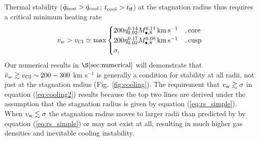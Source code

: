 \documentclass[usenatbib,fleqn]{mn2e}
\newcommand\lsim{\mathrel{\rlap{\lower4pt\hbox{\hskip1pt$\sim$}}
    \raise1pt\hbox{$<$}}}
\newcommand\gsim{\mathrel{\rlap{\lower4pt\hbox{\hskip1pt$\sim$}}
    \raise1pt\hbox{$>$}}}
\begin{document}
Thermal stability ($\dot{q}_{\rm heat} > \dot{q}_{\rm cool}$; $t_{\rm cool} > t_{\rm ff}$) at the stagnation radius thus requires a critical minimum heating rate
\begin{align}
v_{w} > v_{\rm CI} \simeq
  {\rm max}\begin{cases}
   200 \eta_{0.02}^{0.14} M_{\bullet,8}^{0.11}\,{\rm km\,s^{-1}}  &, \text{core}\\
   200 \eta_{0.02}^{0.17} M_{\bullet,8}^{0.08}\,{\rm km\,s^{-1}}   &, \text{cusp}\\
\sigma,     
  \end{cases}
  \label{eq:cooling2}
\end{align}
Our numerical results in $\S\ref{sec:numerical}$ will demonstrate that $\tilde{v}_{w} \gtrsim v_{\rm CI} \sim 200-300$ km s$^{-1}$ is generally a condition for stability at all radii, not just at the stagnation radius (Fig.~\ref{fig:cooling}).  The requirement that $v_{\rm w} \gtrsim \sigma$ in equation (\ref{eq:cooling2}) results because the top two lines are derived under the assumption that the stagnation radius is given by equation (\ref{eq:rs_simple}).  When $v_{\rm w} \lesssim \sigma$ the stagnation radius moves to larger radii than predicted by by equation (\ref{eq:rs_simple}) or may not exist at all, resulting in much higher gas densities and inevitable cooling instability.  




\end{document}
